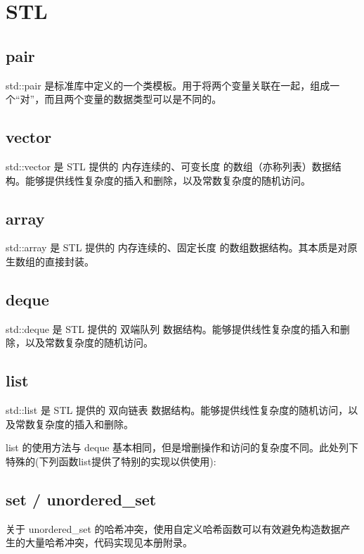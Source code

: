 \chapter{STL}

\begin{center}
\end{center}

\section{pair}
std::pair 是标准库中定义的一个类模板。用于将两个变量关联在一起，组成一个“对”，而且两个变量的数据类型可以是不同的。


\section{vector}
std::vector 是 STL 提供的 内存连续的、可变长度 的数组（亦称列表）数据结构。能够提供线性复杂度的插入和删除，以及常数复杂度的随机访问。


\section{array}
std::array 是 STL 提供的 内存连续的、固定长度 的数组数据结构。其本质是对原生数组的直接封装。


\section{deque}
std::deque 是 STL 提供的 双端队列 数据结构。能够提供线性复杂度的插入和删除，以及常数复杂度的随机访问。


\section{list}
std::list 是 STL 提供的 双向链表 数据结构。能够提供线性复杂度的随机访问，以及常数复杂度的插入和删除。

list 的使用方法与 deque 基本相同，但是增删操作和访问的复杂度不同。此处列下特殊的(下列函数list提供了特别的实现以供使用):


\section{set / unordered\_set}
关于 unordered\_set 的哈希冲突，使用自定义哈希函数可以有效避免构造数据产生的大量哈希冲突，代码实现见本册附录。

